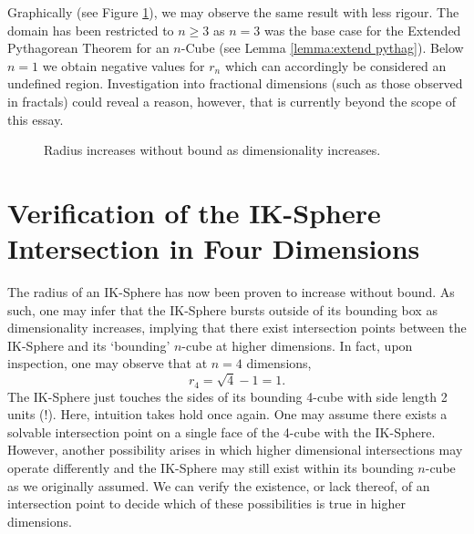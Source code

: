 Graphically (see Figure \ref{fig:radius increases graph}), we may observe the same result with less rigour. The domain has been restricted to $n\geq3$ as $n=3$ was the base case for the Extended Pythagorean Theorem for an $n$-Cube (see Lemma \ref{lemma:extend pythag}). Below $n=1$ we obtain negative values for $r_n$ which can accordingly be considered an undefined region. Investigation into fractional dimensions (such as those observed in fractals) could reveal a reason, however, that is currently beyond the scope of this essay.
\begin{figure}[H]
    \centering
    \caption{Radius increases without bound as dimensionality increases.}
    \label{fig:radius increases graph}
\end{figure}






\section{Verification of the IK-Sphere Intersection in Four Dimensions}
The radius of an IK-Sphere has now been proven to increase without bound. As such, one may infer that the IK-Sphere bursts outside of its bounding box as dimensionality increases, implying that there exist intersection points between the IK-Sphere and its `bounding' $n$-cube at higher dimensions. In fact, upon inspection, one may observe that at $n=4$ dimensions, $$r_4=\sqrt{4}-1=1.$$ The IK-Sphere just touches the sides of its bounding 4-cube with side length 2 units (!). Here, intuition takes hold once again. One may assume there exists a solvable intersection point on a single face of the 4-cube with the IK-Sphere. However, another possibility arises in which higher dimensional intersections may operate differently and the IK-Sphere may still exist within its bounding $n$-cube as we originally assumed. We can verify the existence, or lack thereof, of an intersection point to decide which of these possibilities is true in higher dimensions.

